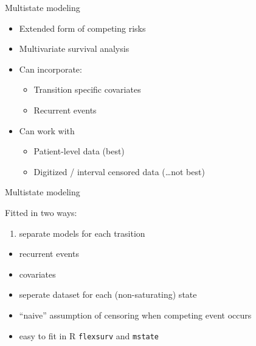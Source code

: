 \documentclass[
  ignorenonframetext,
]{beamer}
\providecommand{\tightlist}{%
  \setlength{\itemsep}{0pt}\setlength{\parskip}{0pt}}
\begin{document}
\begin{frame}{Multistate modeling}
\protect\hypertarget{multistate-modeling-1}{}

\begin{itemize}
\tightlist
\item
  Extended form of competing risks
\item
  Multivariate survival analysis
\item
  Can incorporate:

  \begin{itemize}
  \tightlist
  \item
    Transition specific covariates
  \item
    Recurrent events
  \end{itemize}
\item
  Can work with

  \begin{itemize}
  \tightlist
  \item
    Patient-level data (best)
  \item
    Digitized / interval censored data (\ldots{}not best)
  \end{itemize}
\end{itemize}

\end{frame}

\begin{frame}[fragile]{Multistate modeling}
\protect\hypertarget{multistate-modeling-2}{}

Fitted in two ways:

\begin{enumerate}
\tightlist
\item
  separate models for each trasition
\end{enumerate}

\begin{itemize}
\tightlist
\item
  recurrent events
\item
  covariates
\item
  seperate dataset for each (non-saturating) state
\item
  ``naive'' assumption of censoring when competing event occurs
\item
  easy to fit in R \texttt{flexsurv} and \texttt{mstate}
\end{itemize}

\end{frame}
\end{document}
